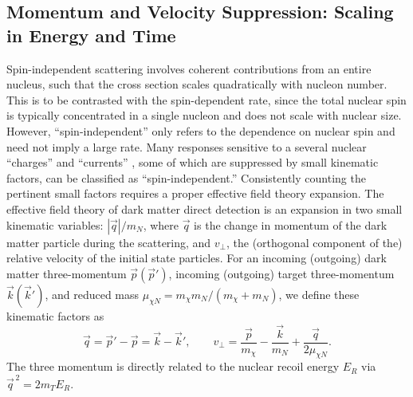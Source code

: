 \documentclass[11pt]{article}
\newcommand{\beq}{\begin{equation}} \newcommand{\eeq}{\end{equation}}
\def\qsq{\vec{q}^{\,2}}
\begin{document}
\subsection{Momentum and Velocity Suppression: Scaling in Energy and Time}

Spin-independent scattering involves coherent contributions from an entire nucleus, such that the cross section scales quadratically with nucleon number. This is to be contrasted with the spin-dependent rate, since the total nuclear spin is typically concentrated in a single nucleon and does not scale with nuclear size. However, ``spin-independent'' only refers to the dependence on nuclear spin and need not imply a large rate. Many responses sensitive to a several nuclear ``charges'' and ``currents'' \cite{Fitzpatrick:2012ix}, some of which are suppressed by small kinematic factors, can be classified as ``spin-independent.'' Consistently counting the pertinent small factors requires a proper effective field theory expansion. The effective field theory of dark matter direct detection \cite{Fitzpatrick:2012ix, Anand:2013yka} is an expansion in two small kinematic variables: $|\vec q|/m_N$, where $\vec q$ is the change in momentum of the dark matter particle during the scattering, and $v_\perp$, the (orthogonal component of the) relative velocity of the initial state particles. For an incoming (outgoing) dark matter three-momentum $\vec p(\vec p')$, incoming (outgoing) target three-momentum $\vec k(\vec k')$, and reduced mass $\mu_{\chi N} = m_\chi m_N/(m_\chi +m_N)$, we define these kinematic factors as \cite{Fitzpatrick:2012ix}
\beq \label{eq:kinematic-definitions}
\vec q=\vec p'-\vec p=\vec k-\vec k', \qquad v_\perp=\frac{\vec p}{m_\chi}-\frac{\vec k}{m_N}+\frac{\vec q}{2\mu_{\chi N}}.
\eeq
The three momentum is directly related to the nuclear recoil energy $E_R$ via $\qsq=2m_TE_R$.
\end{document}
